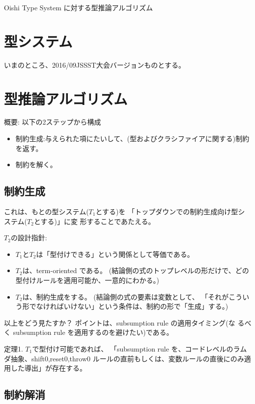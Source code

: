 \documentclass{jsarticle}
\begin{document}
\begin{center}
  Oishi Type System に対する型推論アルゴリズム
\end{center}

\section{型システム}

いまのところ、2016/09JSSST大会バージョンものとする。

\section{型推論アルゴリズム}

概要: 以下の2ステップから構成
\begin{itemize}
\item 制約生成:与えられた項にたいして、(型およびクラシファイアに関する)制約を返す。
\item 制約を解く。
\end{itemize}

\subsection{制約生成}

これは、もとの型システム($T_1$とする)を
「トップダウンでの制約生成向け型システム($T_2$とする)」に変
形することであたえる。

$T_2$の設計指針:
\begin{itemize}
\item $T_1$と$T_2$は「型付けできる」という関係として等価である。
\item $T_2$は、term-oriented である。
  (結論側の式のトップレベルの形だけで、どの型付けルールを適用可能か、一意的にわかる。)
\item $T_2$は、制約生成をする。
  (結論側の式の要素は変数として、
  「それがこういう形でなければいけない」という条件は、制約の形で「生成」する。)
\end{itemize}

以上をどう見たすか？ ポイントは、subsumption rule の適用タイミング(な
るべく subsumption rule を適用するのを避けたい)である。

定理1. $T_1$で型付け可能であれば、
「subsumption rule を、コードレベルのラムダ抽象、shift0,reset0,throw0
ルールの直前もしくは、変数ルールの直後にのみ適用した導出」が存在する。


\subsection{制約解消}
\end{document}
